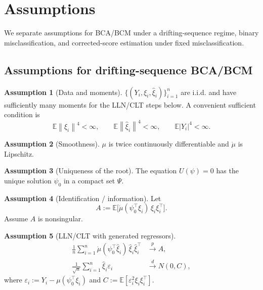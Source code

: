 \documentclass[11pt]{article}
\theoremstyle{definition}
\newtheorem{assumption}{Assumption}
\theoremstyle{remark}
\newcommand{\E}{\mathbb{E}}
\newcommand{\toP}{\xrightarrow{\,p\,}}
\newcommand{\tod}{\xrightarrow{\,d\,}}
\newcommand{\norm}[1]{\left\lVert #1 \right\rVert}
\begin{document}
\section{Assumptions}

We separate assumptions for BCA/BCM under a drifting-sequence regime, binary misclassification, and corrected-score estimation under fixed misclassification.

\subsection{Assumptions for drifting-sequence BCA/BCM}\label{sec:assump-drift}

\begin{assumption}[Data and moments]\label{ass:moments}
$\{(Y_i,\xi_i,\hat\xi_i)\}_{i=1}^n$ are i.i.d. and have sufficiently many moments for the LLN/CLT steps below.
A convenient sufficient condition is
\[
\E\norm{\xi_i}^4<\infty,\qquad \E\norm{\hat\xi_i}^4<\infty,\qquad \E|Y_i|^4<\infty.
\]
\end{assumption}

\begin{assumption}[Smoothness]\label{ass:smooth}
$\mu$ is twice continuously differentiable and $\dot\mu$ is Lipschitz.
\end{assumption}
\begin{assumption}[Uniqueness of the root]
    The equation $U(\psi) = 0$ has the unique solution $\psi_0$ in a compact set $\Psi.$
\end{assumption}

\begin{assumption}[Identification / information]
Let
\begin{equation}
A:=\E\big[\dot\mu(\psi_0^\top\xi_i)\,\xi_i\xi_i^\top\big].
\label{eq:A}
\end{equation}
Assume $A$ is nonsingular.
\end{assumption}

\begin{assumption}[LLN/CLT with generated regressors]\label{ass:LLN/CLT}
\begin{align}
\frac{1}{n}\sum_{i=1}^n \dot\mu(\psi_0^\top\hat\xi_i)\,\hat\xi_i\hat\xi_i^\top &\toP A,\label{eq:llnA}\\
\frac{1}{\sqrt{n}}\sum_{i=1}^n \hat\xi_i\varepsilon_i &\tod N(0,C),\label{eq:clt}
\end{align}
where $\varepsilon_i:=Y_i-\mu(\psi_0^\top\xi_i)$ and $C:=\E[\varepsilon_i^2\xi_i\xi_i^\top]$.
\end{assumption}
\end{document}
